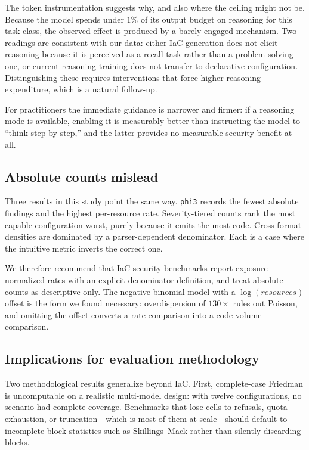 \documentclass[conference]{IEEEtran}
\begin{document}
The token instrumentation suggests why, and also where the ceiling might not be.
Because the model spends under $1\%$ of its output budget on reasoning for this
task class, the observed effect is produced by a barely-engaged mechanism. Two
readings are consistent with our data: either IaC generation does not elicit
reasoning because it is perceived as a recall task rather than a problem-solving
one, or current reasoning training does not transfer to declarative
configuration. Distinguishing these requires interventions that force higher
reasoning expenditure, which is a natural follow-up.

For practitioners the immediate guidance is narrower and firmer: if a reasoning
mode is available, enabling it is measurably better than instructing the model to
``think step by step,'' and the latter provides no measurable security benefit at
all.

\subsection{Absolute counts mislead}
Three results in this study point the same way. \texttt{phi3} records the fewest
absolute findings and the highest per-resource rate. Severity-tiered counts rank
the most capable configuration worst, purely because it emits the most code.
Cross-format densities are dominated by a parser-dependent denominator. Each is a
case where the intuitive metric inverts the correct one.

We therefore recommend that IaC security benchmarks report exposure-normalized
rates with an explicit denominator definition, and treat absolute counts as
descriptive only. The negative binomial model with a $\log(\textit{resources})$
offset is the form we found necessary: overdispersion of $130\times$ rules out
Poisson, and omitting the offset converts a rate comparison into a code-volume
comparison.

\subsection{Implications for evaluation methodology}
Two methodological results generalize beyond IaC. First, complete-case Friedman
is uncomputable on a realistic multi-model design: with twelve configurations,
no scenario had complete coverage. Benchmarks that lose cells to refusals, quota
exhaustion, or truncation---which is most of them at scale---should default to
incomplete-block statistics such as Skillings--Mack rather than silently
discarding blocks.
\end{document}
